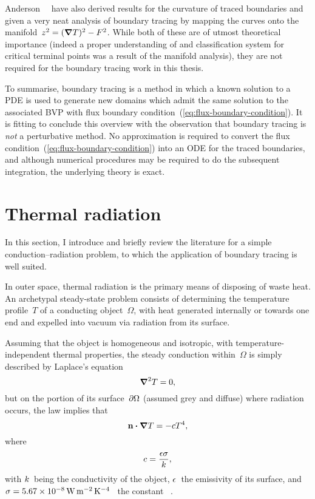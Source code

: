 Anderson~\etal~\cite{anderson-2007-boundary-tracing-i-theory}
have also derived results for the curvature of traced boundaries
and given a very neat analysis of boundary tracing
by mapping the curves onto the manifold~$z^2 = (\mathop{}\!\boldsymbol{\mathbf{\nabla}} T)^2 - F^2$.
While both of these are of utmost theoretical importance
(indeed a proper understanding of and classification system for
critical terminal points was a result of the manifold analysis),
they are not required for the boundary tracing work in this thesis.

To summarise, boundary tracing is a method in which
a known solution to a PDE is used
to generate new domains which admit the same solution
to the associated BVP
with flux boundary condition~(\ref{eq:flux-boundary-condition}).
It is fitting to conclude this overview with the observation that
boundary tracing is \emph{not} a perturbative method.
No approximation is required
to convert the flux condition~(\ref{eq:flux-boundary-condition})
into an ODE for the traced boundaries,
and although numerical procedures may be required
to do the subsequent integration,
the underlying theory is exact.

\section{Thermal radiation}
\label{sec:introduction.radiation}

In this section,
I introduce and briefly review the literature for
a simple conduction--radiation problem,
to which the application of boundary tracing is well suited.

In outer space,
thermal radiation is the primary means of disposing of waste heat.
An archetypal steady-state problem consists of
determining the temperature profile~$T$ of a conducting object~$\Omega$,
with heat generated internally or towards one end
and expelled into vacuum via radiation from its surface.

Assuming that the object is homogeneous and isotropic,
with temperature-independent thermal properties,
the steady conduction within~$\Omega$
is simply described by Laplace's equation
\begin{equation}
  \mathop{}\!\boldsymbol{\mathbf{\nabla}}^2 T = 0,
  \label{eq:laplace-steady-conduction}
\end{equation}
but on the portion of its surface~$\mathop{}\!\partial \Omega$
(assumed grey and diffuse) where radiation occurs,
the \stefanboltz{} law implies that
\begin{equation}
  \mathop{}\!\boldsymbol{\mathbf{n}} \boldsymbol{\cdot} \mathop{}\!\boldsymbol{\mathbf{\nabla}} T = - c T^4,
  \label{eq:radiation-boundary-condition}
\end{equation}
where
\begin{equation}
  c = \frac{\epsilon \sigma}{k},
  \label{eq:radiation-constant}
\end{equation}
with $k$~being the conductivity of the object,
$\epsilon$~the emissivity of its surface,
and $\stefan = \SI{5.67e-8}{\watt \per\metre\squared \per\kelvin\tothe{4}}$~%
the \stefanboltz{} constant~%
\cite{tiesinga-2019-2018-codata-recommended-constants}.

